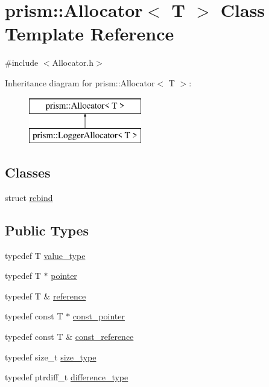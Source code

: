 \hypertarget{classprism_1_1_allocator}{}\section{prism\+:\+:Allocator$<$ T $>$ Class Template Reference}
\label{classprism_1_1_allocator}


{\ttfamily \#include $<$Allocator.\+h$>$}

Inheritance diagram for prism\+:\+:Allocator$<$ T $>$\+:\begin{figure}[H]
\begin{center}
\leavevmode
\includegraphics[height=2.000000cm]{classprism_1_1_allocator}
\end{center}
\end{figure}
\subsection*{Classes}
\begin{DoxyCompactItemize}
\item 
struct \hyperlink{structprism_1_1_allocator_1_1rebind}{rebind}
\end{DoxyCompactItemize}
\subsection*{Public Types}
\begin{DoxyCompactItemize}
\item 
typedef T \hyperlink{classprism_1_1_allocator_a45426ee64e0aba097a532e0ef5ff5700}{value\+\_\+type}
\item 
typedef T $\ast$ \hyperlink{classprism_1_1_allocator_ad3c6706a7243bd3ef489e16d34d5750f}{pointer}
\item 
typedef T \& \hyperlink{classprism_1_1_allocator_a5dde9876d2ed0ca292d8a2019ac2836f}{reference}
\item 
typedef const T $\ast$ \hyperlink{classprism_1_1_allocator_af6a4a91dfc203203ecc319a457ce4dce}{const\+\_\+pointer}
\item 
typedef const T \& \hyperlink{classprism_1_1_allocator_a89911899c97ae877a81b798957a2d899}{const\+\_\+reference}
\item 
typedef size\+\_\+t \hyperlink{classprism_1_1_allocator_a47cb9435e4e9ff4c934ea3d4b4338d52}{size\+\_\+type}
\item 
typedef ptrdiff\+\_\+t \hyperlink{classprism_1_1_allocator_a1769ae6e60e970a4d30ee15275f7ac6d}{difference\+\_\+type}
\end{DoxyCompactItemize}
